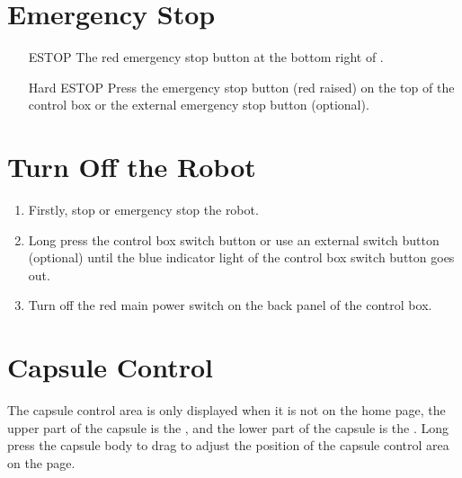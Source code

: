 
\clearpage

\section{Emergency Stop}

\begin{itemize}[leftmargin=3.5em]
	\item[ESTOP] The red emergency stop button at the bottom right of \LM.
	\item[Hard ESTOP] Press the emergency stop button (red raised) on the top of the control box or the external emergency stop button (optional).
\end{itemize}


\section{Turn Off the Robot}
\begin{enumerate}
	\item Firstly, stop or emergency stop the robot.
	\item Long press the control box switch button or use an external switch button (optional) until the blue indicator light of the control box switch button goes out.
	\item Turn off the red main power switch on the back panel of the control box.
\end{enumerate}


\section{Capsule Control}
The capsule control area is only displayed when it is not on the home page, the upper part of the capsule is the , and the lower part of the capsule is the . Long press the capsule body to drag to adjust the position of the capsule control area on the page.

